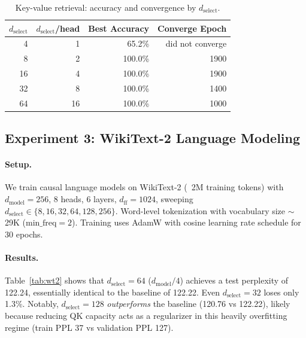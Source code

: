 \documentclass{article} %
\newcommand{\dmodel}{d_{\text{model}}}
\newcommand{\dselect}{d_{\text{select}}}
\begin{document}
\begin{table}[h]
\centering
\caption{Key-value retrieval: accuracy and convergence by $\dselect$.}
\label{tab:kvretrieval}
\begin{tabular}{rrrr}
\toprule
$\dselect$ & $\dselect$/head & Best Accuracy & Converge Epoch \\
\midrule
4  & 1  & 65.2\%  & did not converge \\
8  & 2  & 100.0\% & 1900 \\
16 & 4  & 100.0\% & 1900 \\
32 & 8  & 100.0\% & 1400 \\
64 & 16 & 100.0\% & 1000 \\
\bottomrule
\end{tabular}
\end{table}


\subsection{Experiment 3: WikiText-2 Language Modeling}

\paragraph{Setup.}
We train causal language models on WikiText-2 \citep{merity2017pointer} (~2M training tokens) with $\dmodel = 256$, 8 heads, 6 layers, $d_{\text{ff}} = 1024$, sweeping $\dselect \in \{8, 16, 32, 64, 128, 256\}$. Word-level tokenization with vocabulary size $\sim$29K ($\text{min\_freq} = 2$). Training uses AdamW with cosine learning rate schedule for 30 epochs.

\paragraph{Results.}
Table~\ref{tab:wt2} shows that $\dselect = 64$ ($\dmodel/4$) achieves a test perplexity of 122.24, essentially identical to the baseline of 122.22. Even $\dselect = 32$ loses only 1.3\%. Notably, $\dselect = 128$ \emph{outperforms} the baseline (120.76 vs 122.22), likely because reducing QK capacity acts as a regularizer in this heavily overfitting regime (train PPL 37 vs validation PPL 127).
\end{document}

